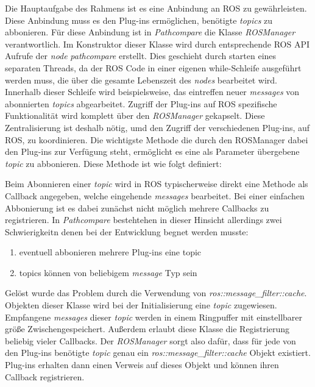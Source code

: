 Die Hauptaufgabe des Rahmens ist es eine Anbindung an ROS zu gewährleisten.
Diese Anbindung muss es den Plug-ins ermöglichen, benötigte \textit{topics} zu
abbonieren. Für diese Anbindung ist in \textit{Pathcompare} die Klasse
\textit{ROSManager} verantwortlich. Im Konstruktor dieser Klasse wird durch
entsprechende \gls{ROS} API Aufrufe der \textit{node} \textit{pathcompare}
erstellt. Dies geschieht durch starten eines separaten Threads, da der ROS Code
in einer eigenen while-Schleife ausgeführt werden muss, die über die gesamte
Lebenszeit des \textit{nodes} bearbeitet wird. Innerhalb dieser Schleife wird
beispielsweise, das eintreffen neuer \textit{messages} von abonnierten
\textit{topics} abgearbeitet.
Zugriff der Plug-ins auf ROS spezifische Funktionalität wird komplett über den
\textit{ROSManager} gekapselt. Diese Zentralisierung ist deshalb nötig, umd den Zugriff
der verschiedenen Plug-ins, auf ROS, zu koordinieren. 
Die wichtigste Methode die durch den ROSManager dabei den Plug-ins zur
Verfügung steht, ermöglicht es eine als Parameter übergebene \textit{topic} zu
abbonieren. 
Diese Methode ist wie folgt definiert:

Beim Abonnieren einer \textit{topic} wird in ROS typischerweise direkt eine
Methode als Callback angegeben, welche eingehende \textit{messages} bearbeitet.
Bei einer einfachen Abbonierung ist es dabei zunächst nicht möglich mehrere
Callbacks zu registrieren.
In \textit{Pathcompare} bestehtehen in dieser Hinsicht allerdings zwei
Schwierigkeitn denen bei der Entwicklung begnet werden musste:

\begin{enumerate}
  \item eventuell abbonieren mehrere Plug-ins eine topic
  \item topics können von beliebigem \textit{message} Typ sein
\end{enumerate}

Gelöst wurde das Problem durch die Verwendung von
\textit{ros::message\_filter::cache}. Objekten dieser Klasse wird bei der
Initialisierung eine \textit{topic} zugewiesen. Empfangene \textit{messages}
dieser \textit{topic} werden in einem Ringpuffer mit einstellbarer größe Zwischengespeichert.
Außerdem erlaubt diese Klasse die Registrierung beliebig vieler Callbacks.
Der \textit{ROSManager} sorgt also dafür, dass für jede von den Plug-ins
benötigte \textit{topic} genau ein \textit{ros::message\_filter::cache} Objekt
existiert. Plug-ins erhalten dann einen Verweis auf dieses Objekt und können
ihren Callback registrieren.

